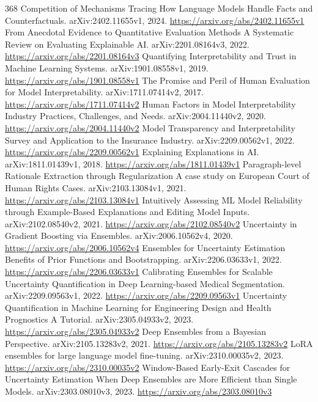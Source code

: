 \documentclass[11pt]{article}
\begin{document}
\begin{thebibliography}{368}
 Competition of Mechanisms Tracing How Language Models Handle Facts and Counterfactuals. arXiv:2402.11655v1, 2024. \url{https://arxiv.org/abs/2402.11655v1}
 From Anecdotal Evidence to Quantitative Evaluation Methods A Systematic Review on Evaluating Explainable AI. arXiv:2201.08164v3, 2022. \url{https://arxiv.org/abs/2201.08164v3}
 Quantifying Interpretability and Trust in Machine Learning Systems. arXiv:1901.08558v1, 2019. \url{https://arxiv.org/abs/1901.08558v1}
 The Promise and Peril of Human Evaluation for Model Interpretability. arXiv:1711.07414v2, 2017. \url{https://arxiv.org/abs/1711.07414v2}
 Human Factors in Model Interpretability Industry Practices, Challenges, and Needs. arXiv:2004.11440v2, 2020. \url{https://arxiv.org/abs/2004.11440v2}
 Model Transparency and Interpretability Survey and Application to the Insurance Industry. arXiv:2209.00562v1, 2022. \url{https://arxiv.org/abs/2209.00562v1}
 Explaining Explanations in AI. arXiv:1811.01439v1, 2018. \url{https://arxiv.org/abs/1811.01439v1}
 Paragraph-level Rationale Extraction through Regularization A case study on European Court of Human Rights Cases. arXiv:2103.13084v1, 2021. \url{https://arxiv.org/abs/2103.13084v1}
 Intuitively Assessing ML Model Reliability through Example-Based Explanations and Editing Model Inputs. arXiv:2102.08540v2, 2021. \url{https://arxiv.org/abs/2102.08540v2}
 Uncertainty in Gradient Boosting via Ensembles. arXiv:2006.10562v4, 2020. \url{https://arxiv.org/abs/2006.10562v4}
 Ensembles for Uncertainty Estimation Benefits of Prior Functions and Bootstrapping. arXiv:2206.03633v1, 2022. \url{https://arxiv.org/abs/2206.03633v1}
 Calibrating Ensembles for Scalable Uncertainty Quantification in Deep Learning-based Medical Segmentation. arXiv:2209.09563v1, 2022. \url{https://arxiv.org/abs/2209.09563v1}
 Uncertainty Quantification in Machine Learning for Engineering Design and Health Prognostics A Tutorial. arXiv:2305.04933v2, 2023. \url{https://arxiv.org/abs/2305.04933v2}
 Deep Ensembles from a Bayesian Perspective. arXiv:2105.13283v2, 2021. \url{https://arxiv.org/abs/2105.13283v2}
 LoRA ensembles for large language model fine-tuning. arXiv:2310.00035v2, 2023. \url{https://arxiv.org/abs/2310.00035v2}
 Window-Based Early-Exit Cascades for Uncertainty Estimation When Deep Ensembles are More Efficient than Single Models. arXiv:2303.08010v3, 2023. \url{https://arxiv.org/abs/2303.08010v3}

\end{thebibliography}
\end{document}
